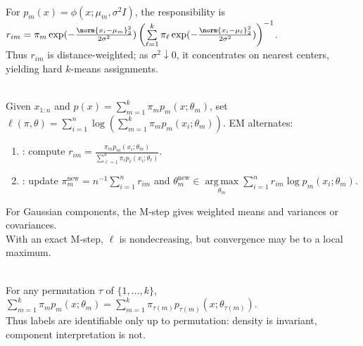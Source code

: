 \begin{remark} \label{rem:sl-gaussian-mixtures-soft-kmeans} \\
For $p_m(x)=\phi(x;\mu_m,\sigma^2I)$, the responsibility is $r_{im}=\pi_m\exp(-\frac{\norm{x_i-\mu_m}_2^2}{2\sigma^2})\left(\sum\limits_{\ell=1}^k\pi_\ell\exp(-\frac{\norm{x_i-\mu_\ell}_2^2}{2\sigma^2})\right)^{-1}$.\\
Thus $r_{im}$ is distance-weighted; as $\sigma^2\downarrow0$, it concentrates on nearest centers, yielding hard $k$-means assignments.
\end{remark}

\begin{method} \label{method:sl-em-algorithm} \\
Given $x_{1:n}$ and $p(x)=\sum\limits_{m=1}^k\pi_mp_m(x;\theta_m)$, set $\ell(\pi,\theta)=\sum\limits_{i=1}^n\log(\sum\limits_{m=1}^k\pi_mp_m(x_i;\theta_m))$. EM alternates:
\begin{enumerate}[label=(\roman*)]
\setlength{\itemsep}{0pt}
\item {}: compute $r_{im}=\frac{\pi_mp_m(x_i;\theta_m)}{\sum\limits_{\ell=1}^k\pi_\ell p_\ell(x_i;\theta_\ell)}$.
\item {}: update $\pi_m^{\mathrm{new}}=n^{-1}\sum\limits_{i=1}^n r_{im}$ and $\theta_m^{\mathrm{new}}\in\operatorname*{arg\,max}\limits_{\theta_m}\sum\limits_{i=1}^n r_{im}\log p_m(x_i;\theta_m)$.
\end{enumerate}
For Gaussian components, the M-step gives weighted means and variances or covariances.\\
With an exact M-step, $\ell$ is nondecreasing, but convergence may be to a local maximum.
\end{method}

\begin{remark} \label{rem:sl-clustering-identifiability} \\
For any permutation $\tau$ of $\{1,\ldots,k\}$, $\sum\limits_{m=1}^k\pi_mp_m(x;\theta_m)=\sum\limits_{m=1}^k\pi_{\tau(m)}p_{\tau(m)}(x;\theta_{\tau(m)})$.\\
Thus labels are identifiable only up to permutation: density is invariant, component interpretation is not.
\end{remark}

